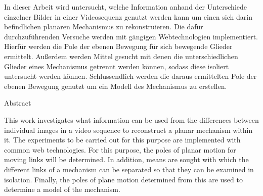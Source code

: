 %
\label{sec:abstract}

In dieser Arbeit wird untersucht, welche Information anhand der Unterschiede einzelner Bilder in einer Videosequenz genutzt werden kann um einen sich darin befindlichen planaren Mechanismus zu rekonstruieren.
Die dafür durchzuführenden Versuche werden mit gängigen Webtechnologien implementiert.
Hierfür werden die Pole der ebenen Bewegung für sich bewegende Glieder ermittelt.
Außerdem werden Mittel gesucht mit denen die unterschiedlichen Glieder eines Mechanismus getrennt werden können, sodass diese isoliert untersucht werden können.
Schlussendlich werden die daraus ermittelten Pole der ebenen Bewegung genutzt um ein Modell des Mechanismus zu erstellen.

\vspace*{20mm}

{Abstract}
\label{sec:abstract-diff}

This work investigates what information can be used from the differences between individual images in a video sequence to reconstruct a planar mechanism within it.
The experiments to be carried out for this purpose are implemented with common web technologies.
For this purpose, the poles of planar motion for moving links will be determined.
In addition, means are sought with which the different links of a mechanism can be separated so that they can be examined in isolation.
Finally, the poles of plane motion determined from this are used to determine a model of the mechanism.
